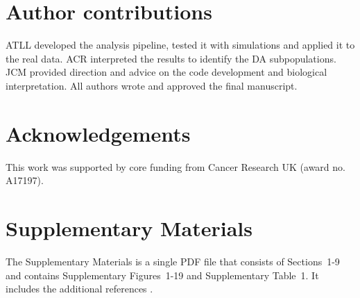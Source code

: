 \documentclass{article}
\newcommand{\suppoverclust}{9}
\newcommand{\suppfigclusterreal}{19}
\begin{document}
\section{Author contributions}
ATLL developed the analysis pipeline, tested it with simulations and applied it to the real data. 
ACR interpreted the results to identify the DA subpopulations.
JCM provided direction and advice on the code development and biological interpretation.
All authors wrote and approved the final manuscript.

\section{Acknowledgements}
This work was supported by core funding from Cancer Research UK (award no. A17197).

\section{Supplementary Materials}
The Supplementary Materials is a single PDF file that consists of Sections~1-\suppoverclust{} and contains Supplementary Figures~1-\suppfigclusterreal{} and Supplementary Table~1.
It includes the additional references \cite{lun2016delicious,robinson2010scaling,mccarthy2009treat}.



\end{document}

